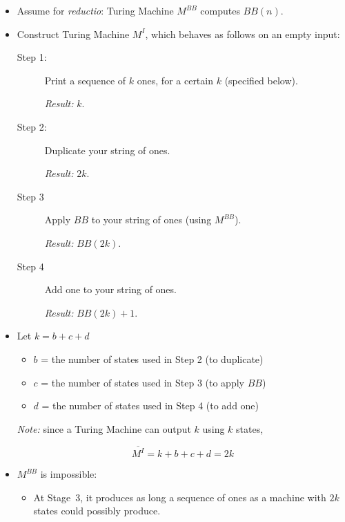 \documentclass[12pt]{extarticle}
\begin{document}
\begin{itemize}

\item Assume for \emph{reductio}: Turing Machine \(M^{BB}\) computes \(BB(n)\). 

\item Construct Turing Machine \(M^I\), which behaves as follows on an empty input:

\begin{description}
\item[Step 1:]
Print a sequence of \(k\) ones, for a certain $k$ (specified below). 

\emph{Result:} $k$.

\item[Step 2:]
Duplicate your string of ones. 

 \emph{Result:} $2k$.

\item [Step 3]
Apply $BB$ to your string of ones (using \(M^{BB}\)).

 \emph{Result:} $BB(2k)$.

\item [Step 4]
Add one to your string of ones.

 \emph{Result:} $BB(2k)+1$.

\end{description}


\item Let $k =  b + c + d$

\begin{itemize}
\item[] \(b\) = the number of states used in Step 2 (to duplicate)

\item[] \(c\) = the number of states used in Step 3 (to apply $BB$)

\item[] \(d\) = the number of states used in Step 4 (to add one)

\end{itemize}
\emph{Note:} since a Turing Machine can output \(k\) using \(k\) states,

$$\overline{M^{I}} = k + b + c + d = 2k$$


\item $M^{BB}$ is impossible:

\begin{itemize}
\item At Stage~3, it produces as long a sequence of ones as a machine with $2k$ states could possibly produce. 


\end{itemize}
\end{itemize}
\end{document}
